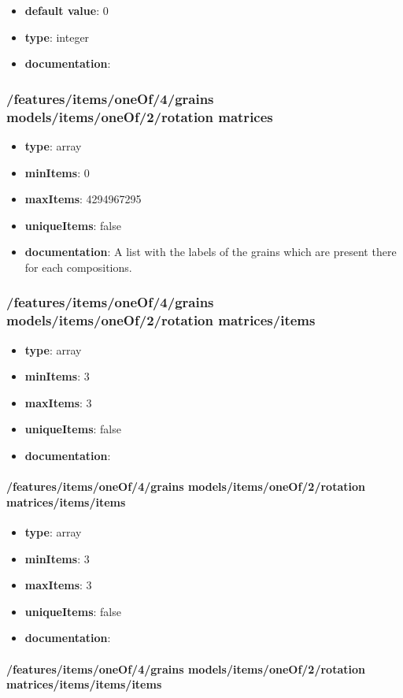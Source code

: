 \begin{itemize}\item {\bf default value}: 0
\item {\bf type}: integer
\item {\bf documentation}: 
\end{itemize}\subsubsection{/features/items/oneOf/4/grains models/items/oneOf/2/rotation matrices}
\begin{itemize}\item {\bf type}: array
\item {\bf minItems}: 0
\item {\bf maxItems}: 4294967295
\item {\bf uniqueItems}: false
\item {\bf documentation}: A list with the labels of the grains which are present there for each compositions.
\end{itemize}\subsubsection{/features/items/oneOf/4/grains models/items/oneOf/2/rotation matrices/items}
\begin{itemize}\item {\bf type}: array
\item {\bf minItems}: 3
\item {\bf maxItems}: 3
\item {\bf uniqueItems}: false
\item {\bf documentation}: 
\end{itemize}\paragraph{/features/items/oneOf/4/grains models/items/oneOf/2/rotation matrices/items/items}
\begin{itemize}\item {\bf type}: array
\item {\bf minItems}: 3
\item {\bf maxItems}: 3
\item {\bf uniqueItems}: false
\item {\bf documentation}: 
\end{itemize}\paragraph{/features/items/oneOf/4/grains models/items/oneOf/2/rotation matrices/items/items/items}
